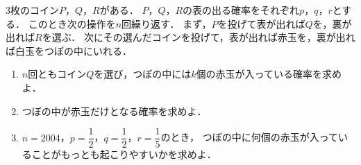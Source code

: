 \documentclass[../../main.tex]{subfiles}
\begin{document}
3枚のコイン$P$，$Q$，$R$がある．
$P$，$Q$，$R$の表の出る確率をそれぞれ$p$，$q$，$r$とする．
このとき次の操作を$n$回繰り返す．
まず，$P$を投げて表が出れば$Q$を，裏が出れば$R$を選ぶ．
次にその選んだコインを投げて，表が出れば赤玉を，裏が出れば白玉をつぼの中にいれる．
\begin{enumerate}
  \item $n$回ともコイン$Q$を選び，つぼの中には$k$個の赤玉が入っている確率を求めよ．
  \item つぼの中が赤玉だけとなる確率を求めよ．
  \item $n=2004$，$\displaystyle p=\dfrac{1}{2}$，$\displaystyle q=\dfrac{1}{2}$，$\displaystyle r=\dfrac{1}{5}$のとき，
    つぼの中に何個の赤玉が入っていることがもっとも起こりやすいかを求めよ．
\end{enumerate}
\end{document}
